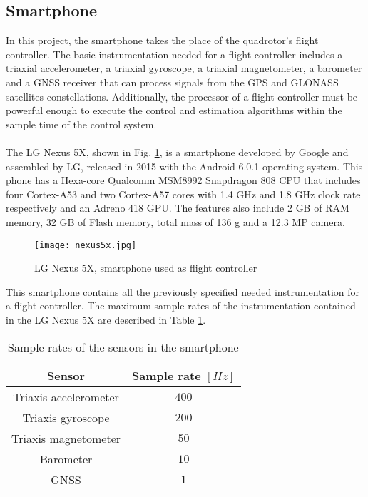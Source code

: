 \subsection{Smartphone}
In this project, the smartphone takes the place of the quadrotor's flight controller. The basic instrumentation needed for a flight controller includes a triaxial accelerometer, a triaxial gyroscope, a triaxial magnetometer, a barometer and a GNSS receiver that can process signals from the GPS and GLONASS satellites constellations. Additionally, the processor of a flight controller must be powerful enough to execute the control and estimation algorithms within the sample time of the control system.
\\\\
The LG Nexus 5X, shown in Fig. \ref{fig:nexus}, is a smartphone developed by Google and assembled by LG, released in 2015 with the Android 6.0.1 operating system. This phone has a Hexa-core Qualcomm MSM8992 Snapdragon 808 CPU that includes four Cortex-A53 and two Cortex-A57 cores with 1.4 GHz and 1.8 GHz clock rate respectively and an Adreno 418 GPU. The features also include 2 GB of RAM memory, 32 GB of Flash memory, total mass of 136 g and a 12.3 MP camera.
\\
\begin{figure}[H]
\begin{center}
\texttt{[image: nexus5x.jpg]}    
\caption[LG Nexus 5X, smartphone used as flight controller]{LG Nexus 5X, smartphone used as flight controller\protect\footnotemark} 
\label{fig:nexus}
\end{center}
 \end{figure}
 \vspace{-0.5cm}
This smartphone contains all the previously specified needed instrumentation for a flight controller. The maximum sample rates of the instrumentation contained in the LG Nexus 5X are described in Table \ref{tb:samplerates}.
\begin{table}[h]
\small
\begin{center}
\caption{Sample rates of the sensors in the smartphone}\label{tb:samplerates}
\begin{tabular}{c|c}\hline
\rule{0pt}{3ex} Sensor & Sample rate $[Hz]$ \\\hline\hline
\rule{0pt}{3ex}Triaxis accelerometer &  $400$ \\[0.7ex]
Triaxis gyroscope &  $200$ \\[0.7ex]
Triaxis magnetometer & $50$ \\[0.7ex]
Barometer &  $10$ \\[0.7ex] 
GNSS &  $1$  \\[0.7ex]\hline
\end{tabular}
\end{center}
\end{table}
